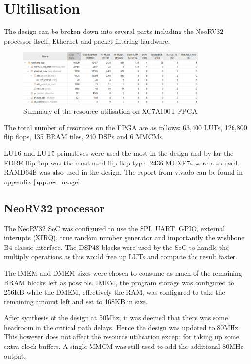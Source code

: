 \section{Ultilisation}

The design can be broken down into several parts including the NeoRV32 processor itself, Ethernet and packet filtering hardware.

\begin{figure}[h]
    \centering
    \includegraphics[width=0.85\textwidth]{Images/FPGAUtilisationResources.png}
    \caption[Summary of the resource utilisation on XC7A100T FPGA]{Summary of the resource utilisation on XC7A100T FPGA.}
    \label{fig:eye_diagram}
\end{figure}

The total number of resoruces on the FPGA are as follows: 63,400 LUTs, 126,800 flip flops, 135 BRAM tiles, 240 DSPs and 6 MMCMs.

LUT6 and LUT5 primatives were used the most in the design and by far the FDRE flip flop was the most used flip flop type. 2436 MUXF7s were also used. RAMD64E was also used in the design. The report from vivado can be found in appendix \ref{app:res_usage}.

\subsection{NeoRV32 processor}

The NeoRV32 SoC was configured to use the SPI, UART, GPIO, external interupts (XIRQ), true random number generator and importantly the wishbone B4 classic interface. The DSP48 blocks were used by the SoC to handle the multiply operations as this would free up LUTs and compute the result faster. 

The IMEM and DMEM sizes were chosen to consume as much of the remaining BRAM blocks left as possible. IMEM, the program storage was configured to 256KB while the DMEM, effectively the RAM, was configured to take the remaining amount left and set to 168KB in size. 

After synthesis of the design at 50Mhz, it was deemed that there was some headroom in the critical path delays. Hence the design was updated to 80MHz. This however does not affect the resource utilisation except for taking up some extra clock buffers. A single MMCM was still used to add the additional 80MHz output. 

